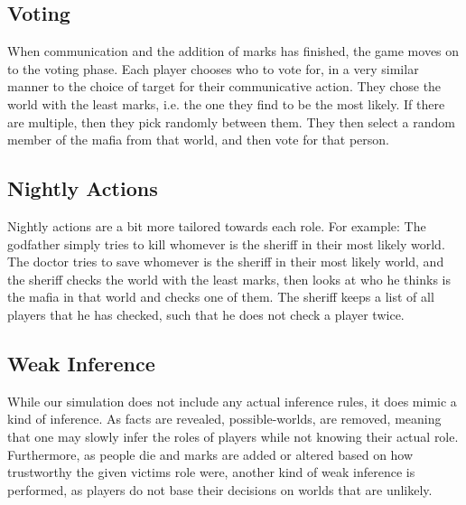 \subsection{Voting}\label{Voting}
When communication and the addition of marks has finished, the game moves on to
the voting phase. Each player chooses who to vote for, in a very similar manner
to the choice of target for their communicative action. They chose the world
with the least marks, i.e. the one they find to be the most likely. If there
are multiple, then they pick randomly between them. They then select a random
member of the mafia from that world, and then vote for that person.
\subsection{Nightly Actions}\label{NightlyActions}
Nightly actions are a bit more tailored towards each role. For example: The
godfather simply tries to kill whomever is the sheriff in their most likely
world. The doctor tries to save whomever is the sheriff in their most likely
world, and the sheriff checks the world with the least marks, then looks at who
he thinks is the mafia in that world and checks one of them. The sheriff keeps
a list of all players that he has checked, such that he does not check a player
twice.
\subsection{Weak Inference}\label{WeakInference}
While our simulation does not include any actual inference rules, it does mimic
a kind of inference. As facts are revealed, possible-worlds, are removed,
meaning that one may slowly infer the roles of players while not knowing their
actual role. Furthermore, as people die and marks are added or altered based on
how trustworthy the given victims role were, another kind of weak inference is
performed, as players do not base their decisions on worlds that are unlikely.
